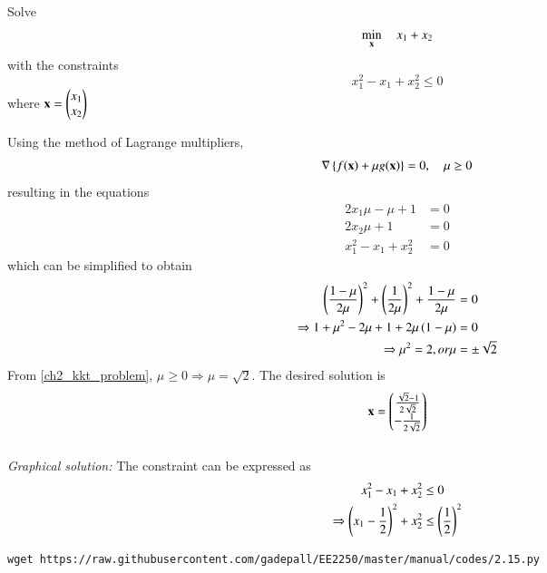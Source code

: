 \documentclass[journal,12pt,twocolumn]{IEEEtran}
\begin{document}
%
\begin{problem}
	\label{convex_sdp_eqiv}
	Solve
	\begin{equation}
	\min_{\mathbf{x}} \quad x_1 + x_2
	\end{equation}
	with the constraints
	\begin{equation}
	x_1^2 - x_1 + x_2^2 \leq 0
	\end{equation}
where 
$
\mathbf{x} = \begin{pmatrix}
x_1 \\
x_2
\end{pmatrix}
$
\end{problem}
\solution Using the method of Lagrange multipliers,
%
\begin{align}
\label{ch2_sd_kkt}
\nabla \left\{f(\mathbf{x})  +  \mu g(\mathbf{x}) \right\}= 0 , \quad \mu \ge 0
\end{align}
%
resulting in the equations
%
\begin{align}
2x_1\mu -\mu + 1 &= 0 \\
2x_2\mu + 1 &=0 \\
x_1^2 -x_1 + x_2^2 &= 0 
\end{align}
%
which can be simplified to obtain 
%
\begin{align}
\left(\frac{1-\mu}{2\mu}\right)^2 + \left(\frac{1}{2\mu}\right)^2 + \frac{1-\mu}{2\mu} &= 0 \\
\Rightarrow 1 + \mu^2 -2\mu + 1 + 2\mu\left(1-\mu\right) &= 0 \\
\Rightarrow \mu^2 =2, or \mu &= \pm \sqrt{2} 
\end{align}
%
From \eqref{ch2_kkt_problem},  $\mu \ge 0 \Rightarrow  \mu = \sqrt{2}$. The desired solution is
%
\begin{equation}
\mathbf{x} = 
\begin{pmatrix}
 \frac{\sqrt{2}-1}{2\sqrt{2}} \\
-\frac{1}{2\sqrt{2}} 
\end{pmatrix}
\end{equation}
%
\\
{\em Graphical solution:} The constraint can be expressed as
%
\begin{align}
x_1^2 - x_1 + x_2^2 &\le 0 \\
\Rightarrow \left(x_1 - \frac{1}{2}\right)^2 + x_2^2 & \le \left(\frac{1}{2}\right)^2
\end{align}
%
%	
\begin{lstlisting}
wget https://raw.githubusercontent.com/gadepall/EE2250/master/manual/codes/2.15.py
\end{lstlisting}
\end{document}
